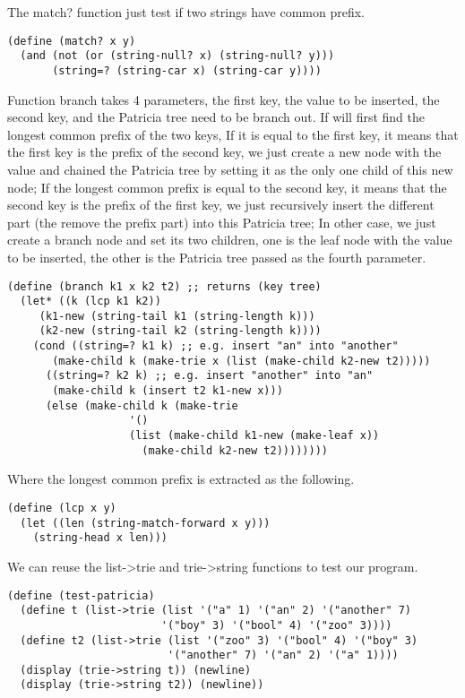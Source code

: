 \documentclass{article}
\begin{document}
The match? function just test if two strings have common prefix.

\begin{lstlisting}
(define (match? x y)
  (and (not (or (string-null? x) (string-null? y)))
       (string=? (string-car x) (string-car y))))
\end{lstlisting}

Function branch takes 4 parameters, the first key, the value to be
inserted, the second key, and the Patricia tree need to be branch
out. If will first find the longest common prefix of the two keys, If
it is equal to the first key, it means that the first key is the prefix of
the second key, we just create a new node with the value and chained
the Patricia tree by setting it as the only one child of this new
node; If the longest common prefix is equal to the second key, it
means that the second key is the prefix of the first key, we just
recursively insert the different part (the remove the prefix part)
into this Patricia tree; In other case, we just create a branch node
and set its two children, one is the leaf node with the value to be
inserted, the other is the Patricia tree passed as the fourth parameter.

\begin{lstlisting}
(define (branch k1 x k2 t2) ;; returns (key tree)
  (let* ((k (lcp k1 k2))
	 (k1-new (string-tail k1 (string-length k)))
	 (k2-new (string-tail k2 (string-length k))))
    (cond ((string=? k1 k) ;; e.g. insert "an" into "another"
	   (make-child k (make-trie x (list (make-child k2-new t2)))))
	  ((string=? k2 k) ;; e.g. insert "another" into "an"
	   (make-child k (insert t2 k1-new x)))
	  (else (make-child k (make-trie
			       '()
			       (list (make-child k1-new (make-leaf x))
				     (make-child k2-new t2))))))))
\end{lstlisting}

Where the longest common prefix is extracted as the following.

\begin{lstlisting}
(define (lcp x y)
  (let ((len (string-match-forward x y)))
    (string-head x len)))
\end{lstlisting}

We can reuse the list->trie and trie->string functions to test our
program.

\begin{lstlisting}
(define (test-patricia)
  (define t (list->trie (list '("a" 1) '("an" 2) '("another" 7)
                        '("boy" 3) '("bool" 4) '("zoo" 3))))
  (define t2 (list->trie (list '("zoo" 3) '("bool" 4) '("boy" 3)
                         '("another" 7) '("an" 2) '("a" 1))))
  (display (trie->string t)) (newline)
  (display (trie->string t2)) (newline))
\end{lstlisting}
\end{document}
